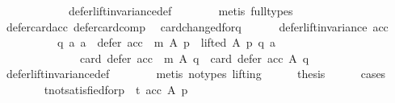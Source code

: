 \begin{isabellebody}
\ \ \ \ \ \ \ \ \ \ \ \ defer{\isacharunderscore}{\kern0pt}lift{\isacharunderscore}{\kern0pt}invariance{\isacharunderscore}{\kern0pt}def\isanewline
\ \ \ \ \ \ \isamarkupfalse%
\ {\isacharparenleft}{\kern0pt}metis\ {\isacharparenleft}{\kern0pt}full{\isacharunderscore}{\kern0pt}types{\isacharparenright}{\kern0pt}{\isacharparenright}{\kern0pt}\isanewline
\ \ \ \ \isamarkupfalse%
\ defer{\isacharunderscore}{\kern0pt}card{\isacharunderscore}{\kern0pt}acc{\isacharunderscore}{\kern0pt}{}\ defer{\isacharunderscore}{\kern0pt}card{\isacharunderscore}{\kern0pt}comp\ \isamarkupfalse%
\ card{\isacharunderscore}{\kern0pt}changed{\isacharunderscore}{\kern0pt}for{\isacharunderscore}{\kern0pt}q{\isacharcolon}{\kern0pt}\isanewline
\ \ \ \ \ \ {\isachardoublequoteopen}defer{\isacharunderscore}{\kern0pt}lift{\isacharunderscore}{\kern0pt}invariance\ {\isacharparenleft}{\kern0pt}acc{\isacharparenright}{\kern0pt}\ {\isasymlongrightarrow}\isanewline
\ \ \ \ \ \ \ \ \ \ {\isacharparenleft}{\kern0pt}{\isasymforall}q\ a{\isachardot}{\kern0pt}\ {\isacharparenleft}{\kern0pt}a\ {\isasymin}\ {\isacharparenleft}{\kern0pt}defer\ {\isacharparenleft}{\kern0pt}acc\ {\isasymtriangleright}\ m{\isacharparenright}{\kern0pt}\ A\ p{\isacharparenright}{\kern0pt}\ {\isasymand}\ lifted\ A\ p\ q\ a{\isacharparenright}{\kern0pt}\ {\isasymlongrightarrow}\isanewline
\ \ \ \ \ \ \ \ \ \ \ \ \ \ {\isacharparenleft}{\kern0pt}card\ {\isacharparenleft}{\kern0pt}defer\ {\isacharparenleft}{\kern0pt}acc\ {\isasymtriangleright}\ m{\isacharparenright}{\kern0pt}\ A\ q{\isacharparenright}{\kern0pt}\ {\isacharless}{\kern0pt}\ card\ {\isacharparenleft}{\kern0pt}defer\ acc\ A\ q{\isacharparenright}{\kern0pt}{\isacharparenright}{\kern0pt}{\isacharparenright}{\kern0pt}{\isachardoublequoteclose}\isanewline
\ \ \ \ \ \ \isamarkupfalse%
\ defer{\isacharunderscore}{\kern0pt}lift{\isacharunderscore}{\kern0pt}invariance{\isacharunderscore}{\kern0pt}def\isanewline
\ \ \ \ \ \ \isamarkupfalse%
\ {\isacharparenleft}{\kern0pt}metis\ {\isacharparenleft}{\kern0pt}no{\isacharunderscore}{\kern0pt}types{\isacharcomma}{\kern0pt}\ lifting{\isacharparenright}{\kern0pt}{\isacharparenright}{\kern0pt}\isanewline
\ \ \ \ \isamarkupfalse%
\ {\isacharquery}{\kern0pt}thesis\isanewline
\ \ \ \ \isamarkupfalse%
\ cases\isanewline
\ \ \ \ \ \ \isamarkupfalse%
\ t{\isacharunderscore}{\kern0pt}not{\isacharunderscore}{\kern0pt}satisfied{\isacharunderscore}{\kern0pt}for{\isacharunderscore}{\kern0pt}p{\isacharcolon}{\kern0pt}\ {\isachardoublequoteopen}{\isasymnot}\ t\ {\isacharparenleft}{\kern0pt}acc\ A\ p{\isacharparenright}{\kern0pt}{\isachardoublequoteclose}\isanewline

\end{isabellebody}
